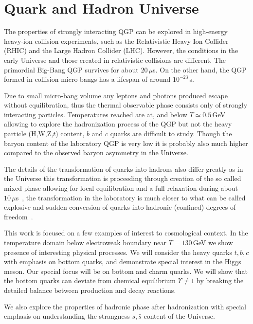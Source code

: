 \section{Quark and Hadron Universe} \label{part2}
The properties of strongly interacting QGP can be explored in high-energy heavy-ion collision experiments, such as  the Relativistic Heavy Ion Collider (RHIC) and the Large Hadron Collider (LHC). However, the conditions in the early Universe and those created in relativistic collisions are different. The primordial  Big-Bang QGP  survives for about $20\,\mu$s. On the other hand, the QGP formed in collision micro-bangs  has a lifespan of around  $10^{-23}$\,s. 

Due to small micro-bang volume any leptons and photons produced escape without equilibration, thus the thermal observable phase consists only of strongly interacting particles. Temperatures reached are at, and below $T\simeq 0.5$\,GeV allowing to explore the hadronization process of the QGP but not the heavy particle (H,W,Z,$t$) content,   $b$ and $c$ quarks are difficult to study.  Though the baryon content of the laboratory QGP is very low it is probably also much higher compared to the observed baryon asymmetry in the Universe. 

The details of the transformation of quarks into hadrons also differ greatly as in the Universe this transformation is proceeding through creation of the so called mixed phase allowing for local equilibration and a full relaxation during about $10\,\mu$s~\cite{Fromerth:2002wb}, the transformation in the laboratory is much closer to what can be called explosive and sudden conversion of quarks into hadronic (confined) degrees of freedom~\cite{Rafelski:2000by}.

This work is focused on a few examples of interest to cosmological context. In the temperature domain below electroweak boundary near  $T=130$\,GeV we show presence of interesting physical processes. We will consider the  heavy quarks $t,b,c$ with emphasis on bottom quarks, and demonstrate special interest in the Higgs meson. Our special focus will be on bottom and charm quarks. We will show that the bottom quarks can deviate from chemical equilibrium $\Upsilon\neq1$ by breaking the detailed balance between production and decay reactions. 

We also explore the properties of hadronic phase after hadronization with special emphasis on understanding the strangness $s,\bar s$ content of the Universe.


